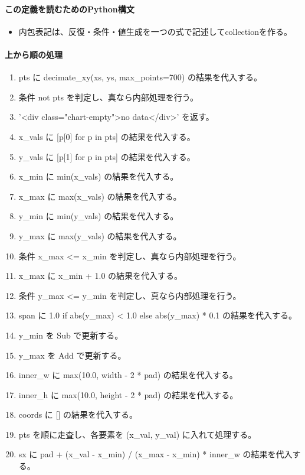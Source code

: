 \documentclass[a4paper,11pt]{article}
\begin{document}
            \paragraph{この定義を読むためのPython構文}
            \begin{itemize}[leftmargin=1.6em]
            \item 内包表記は、反復・条件・値生成を一つの式で記述してcollectionを作る。
            \end{itemize}
            \paragraph{上から順の処理}
            \begin{enumerate}[leftmargin=1.8em]
            \item pts に decimate\_xy(xs, ys, max\_points=700) の結果を代入する。
\item 条件 not pts を判定し、真なら内部処理を行う。
\item   '<div class="chart-empty">no data</div>' を返す。
\item x\_vals に [p[0] for p in pts] の結果を代入する。
\item y\_vals に [p[1] for p in pts] の結果を代入する。
\item x\_min に min(x\_vals) の結果を代入する。
\item x\_max に max(x\_vals) の結果を代入する。
\item y\_min に min(y\_vals) の結果を代入する。
\item y\_max に max(y\_vals) の結果を代入する。
\item 条件 x\_max <= x\_min を判定し、真なら内部処理を行う。
\item   x\_max に x\_min + 1.0 の結果を代入する。
\item 条件 y\_max <= y\_min を判定し、真なら内部処理を行う。
\item   span に 1.0 if abs(y\_max) < 1.0 else abs(y\_max) * 0.1 の結果を代入する。
\item   y\_min を Sub で更新する。
\item   y\_max を Add で更新する。
\item inner\_w に max(10.0, width - 2 * pad) の結果を代入する。
\item inner\_h に max(10.0, height - 2 * pad) の結果を代入する。
\item coords に [] の結果を代入する。
\item pts を順に走査し、各要素を (x\_val, y\_val) に入れて処理する。
\item   sx に pad + (x\_val - x\_min) / (x\_max - x\_min) * inner\_w の結果を代入する。

\end{enumerate}
\end{document}
